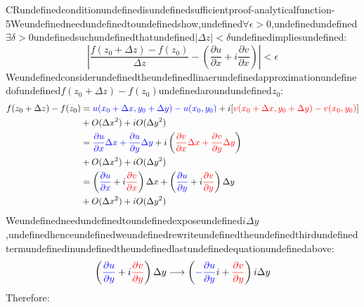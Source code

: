 \begin{mystthmproof}{CRundefinedconditionundefinedisundefinedsufficient}{proof-analyticalfunction-5}Weundefinedneedundefinedtoundefinedshow,undefined$\forall \epsilon >0$,undefinedundefined$\exists \delta >0$undefinedsuchundefinedthatundefined$|\Delta z|<\delta$undefinedimpliesundefined:
\begin{equation}
\left| \frac{f(z_0+\Delta z)-f(z_0)}{\Delta z} - \left(\frac{\partial u}{\partial x} + i\frac{\partial v}{\partial x}\right) \right| < \epsilon
\end{equation}
Weundefinedconsiderundefinedtheundefinedlinaerundefinedapproximationundefinedofundefined$f(z_0+\Delta z) -f(z_0)$undefinedaroundundefined$z_0$:
\begin{equation}
\begin{aligned}
f(z_0+\Delta z)-f(z_0)&=\textcolor{blue}{u(x_0+\Delta x,y_0+\Delta y)-u(x_0,y_0)} + i[\textcolor{red}{v(x_0+\Delta x, y_0+\Delta y)-v(x_0,y_0)}]
\\ &+ O(\Delta x^2) + iO(\Delta y^2) \\
&= \textcolor{blue}{\frac{\partial u}{\partial x}\Delta x +\frac{\partial u}{\partial y} \Delta y} +i\left(\textcolor{red}{\frac{\partial v}{\partial x}\Delta x +\frac{\partial v}{\partial y}\Delta y} \right) \\ &+ O(\Delta x^2)+iO(\Delta y^2) \\
&= \left(\textcolor{blue}{\frac{\partial u}{\partial x}}+i\textcolor{red}{\frac{\partial v}{\partial x}}\right)\Delta x+\left(\textcolor{blue}{\frac{\partial u}{\partial y}} + i\textcolor{red}{\frac{\partial v}{\partial y}}\right)\Delta y\\ &+ O(\Delta x^2)+iO(\Delta y^2) \\
\end{aligned}
\end{equation}
Weundefinedneedundefinedtoundefinedexposeundefined$i\Delta y$,undefinedhenceundefinedweundefinedrewriteundefinedtheundefinedthirdundefinedtermundefinedinundefinedtheundefinedlastundefinedequationundefinedabove:
\begin{equation}
\left(\textcolor{blue}{\frac{\partial u}{\partial y}} + i\textcolor{red}{\frac{\partial v}{\partial y}}\right)\Delta y \longrightarrow \left(\textcolor{blue}{-\frac{\partial u}{\partial y}}i + \textcolor{red}{\frac{\partial v}{\partial y}}\right)i\Delta y
\end{equation}
Therefore:
\begin{equation}
\begin{aligned}

\end{aligned}
\end{equation}
\end{mystthmproof}
